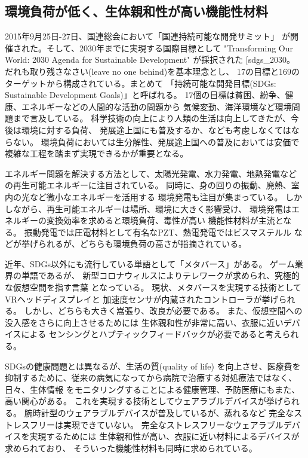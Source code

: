\documentclass[dvipdfmx,12pt,a4paper]{jreport}
\makeatletter
\DeclareRobustCommand\cite{\unskip
    	\@ifnextchar[{\@tempswatrue\@citex}{\@tempswafalse\@citex[]}}
\makeatother
\begin{document}
		\subsection{環境負荷が低く、生体親和性が高い機能性材料}
		2015年9月25日-27日、国連総会において「国連持続可能な開発サミット」
		が開催された。そして、2030年までに実現する国際目標として
		 "Transforming Our World: 2030 Agenda for Sustainable Development" が採択された\cite{sdgs_2030}。
		だれも取り残さなさい(leave no one behind)を基本理念とし、
		17の目標と169のターゲットから構成されている。まとめて
		「持続可能な開発目標(SDGs: Sustainable Development Goals)」と呼ばれる。
		17個の目標は貧困、紛争、健康、エネルギーなどの人間的な活動の問題から
		気候変動、海洋環境など環境問題まで言及している。
		科学技術の向上により人類の生活は向上してきたが、今後は環境に対する負荷、
		発展途上国にも普及するか、なども考慮しなくてはならない。
		環境負荷においては生分解性、発展途上国への普及においては安価で複雑な工程を踏まず実現できるかが重要となる。

		エネルギー問題を解決する方法として、太陽光発電、水力発電、地熱発電など
		の再生可能エネルギーに注目されている。
		同時に、身の回りの振動、廃熱、室内の光など微小なエネルギーを活用する
		環境発電も注目が集まっている。
		しかしながら、再生可能エネルギーは場所、環境に大きく影響受け、
		環境発電はエネルギーの変換効率を求めると環境負荷、毒性が高い
		機能性材料が主流となる。
		振動発電では圧電材料として有名なPZT、熱電発電ではビスマステルル
		などが挙げられるが、どちらも環境負荷の高さが指摘されている。

		近年、SDGs以外にも流行している単語として「メタバース」がある。
		ゲーム業界の単語であるが、
		新型コロナウィルスによりテレワークが求められ、究極的な仮想空間を指す言葉
		となっている。
		現状、メタバースを実現する技術としてVRヘッドディスプレイと
		加速度センサが内蔵されたコントローラが挙げられる。
		しかし、どちらも大きく嵩張り、改良が必要である。
		また、仮想空間への没入感をさらに向上させるためには
		生体親和性が非常に高い、衣服に近いデバイスによる
		センシングとハプティックフィードバックが必要であると考えられる。

		SDGsの健康問題とは異なるが、生活の質(quality of life) を向上させ、医療費を
		抑制するために、従来の病気になってから病院で治療する対処療法ではなく、日々、生体情報
		をモニタリングすることによる健康管理、予防医療にもまた、高い関心がある。
		これを実現する技術としてウェアラブルデバイスが挙げられる。
		腕時計型のウェアラブルデバイスが普及しているが、蒸れるなど
		完全なストレスフリーは実現できていない。
		完全なストレスフリーなウェアラブルデバイスを実現するためには
		生体親和性が高い、衣服に近い材料によるデバイスが求められており、
		そういった機能性材料も同時に求められている。
		\newpage
\end{document}
